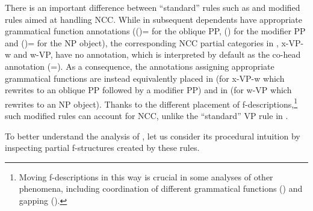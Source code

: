 \documentclass[output=paper]{../langscibook}
\begin{document}
There is an important difference between ``standard'' rules such
as  and modified rules aimed at
handling NCC. While in
 subsequent dependents have appropriate
grammatical function annotations ({(\UP\OBL)=\DOWN} for the oblique
PP, \mbox{\DOWN{$\in$}(\UP\ADJ)} for the modifier PP
and {(\UP\OBJ)=\DOWN} for the NP object), the
corresponding NCC partial categories in ,
x-VP-w and w-VP, have no annotation, which is interpreted by default
as the co-head annotation
({\DOWN=\UP}). As a consequence, the annotations assigning
appropriate grammatical functions are instead equivalently placed in
 (for x-VP-w which rewrites to an
oblique PP followed by a modifier PP) and in
 (for w-VP which rewrites to an NP
object).
%
Thanks to the different placement of f-descriptions,\footnote{Moving
  f-descriptions in this way is crucial in some analyses of other phenomena,
  including coordination of different grammatical functions
  () and gapping ().} such
modified rules can account for NCC, unlike the ``standard'' VP rule in
.

To better understand the analysis of \citet{max:man:96}, let us consider its
procedural intuition by inspecting partial f-structures created by
these rules.
\end{document}
